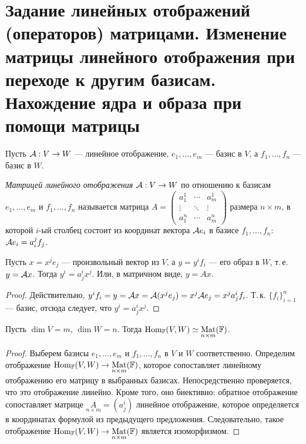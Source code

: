 \section{Задание линейных отображений (операторов) матрицами. Изменение матрицы линейного отображения при переходе к другим базисам. Нахождение ядра и образа при помощи матрицы}

Пусть $\mathcal{A}: V \to W$ --- линейное отображение, $e_1, \ldots, e_m$ --- базис в $V$, а $f_1, \ldots, f_n$ --- базис в $W$.

\begin{definition}
    \textit{Матрицей линейного отображения} $\mathcal{A}: V \to W$ по отношению к базисам $e_1, \ldots, e_m$ и $f_1, \ldots, f_n$ называется матрица
    $
    A = 
    \begin{pmatrix}
        a^1_1 & \cdots & a^1_m\\
        \vdots & \ddots & \vdots\\
        a^n_1 & \cdots & a^n_m
    \end{pmatrix}
    $
    размера $n \times m$, в которой $i$-ый столбец состоит из координат вектора $\mathcal{A} e_i$ в базисе $f_1, \ldots, f_n$: $\mathcal{A} e_i = a^j_if_j$.
\end{definition}

\begin{proposal}
    Пусть $x = x^je_j$ --- произвольный вектор из $V$, а $y = y^if_i$ --- его образ в $W$, т.\,е. $y = \mathcal{A} x$. Тогда $y^i = a^i_jx^j$. Или, в матричном виде, $y = Ax$.
\end{proposal}

\begin{proof}
    Действительно, $y^if_i = y = \mathcal{A} x = \mathcal{A}(x^je_j) = x^j\mathcal{A} e_j = x^ja^i_jf_i$. Т.\,к. $\{f_i\}_{i = 1}^n$ --- базис, отсюда следует, что $y^i = a^i_jx^j$.
\end{proof}

\begin{proposal}
    Пусть $\dim V = m$, $\dim W = n$. Тогда $\operatorname{Hom}_{\mathbb{F}}(V, W) \simeq \underset{n \times m}{\operatorname{Mat}}(\mathbb{F})$.
\end{proposal}

\begin{proof}
    Выберем базисы $e_1, \ldots, e_m$ и $f_1, \ldots, f_n$ в $V$ и $W$ соответственно. Определим отображение $\operatorname{Hom}_{\mathbb{F}}(V, W) \to \underset{n \times m}{\operatorname{Mat}}(\mathbb{F})$, которое сопоставляет линейному отображению его матрицу в выбранных базисах. Непосредственно проверяется, что это отображение линейно. Кроме того, оно биективно: обратное отображение сопоставляет матрице $\underset{n \times m}{A} = (a^i_j)$ линейное отображение, которое определяется в координатах формулой из предыдущего предложения. Следовательно, такое отображение $\operatorname{Hom}_{\mathbb{F}}(V, W) \to \underset{n \times m}{\operatorname{Mat}}(\mathbb{F})$ является изоморфизмом.
\end{proof}

